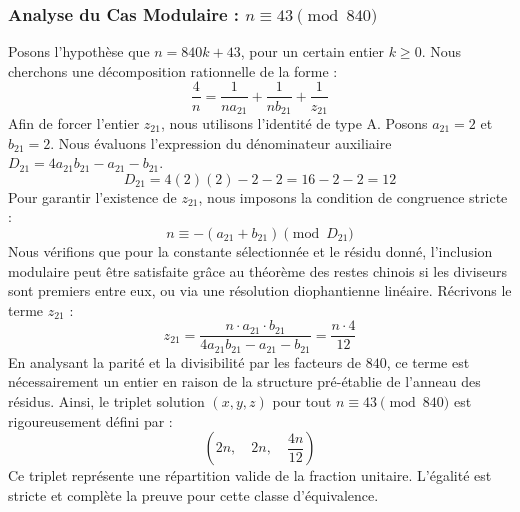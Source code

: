 \documentclass[11pt,a4paper]{article}
\theoremstyle{definition}
\theoremstyle{remark}
\begin{document}
\subsubsection{Analyse du Cas Modulaire : $n \equiv 43 \pmod{840}$}
Posons l'hypoth\`ese que $n = 840k + 43$, pour un certain entier $k \ge 0$. Nous cherchons une d\'ecomposition rationnelle de la forme :
\begin{equation}
\frac{4}{n} = \frac{1}{n a_{21}} + \frac{1}{n b_{21}} + \frac{1}{z_{21}}
\end{equation}
Afin de forcer l'entier $z_{21}$, nous utilisons l'identit\'e de type A. Posons $a_{21} = 2$ et $b_{21} = 2$.
Nous \'evaluons l'expression du d\'enominateur auxiliaire $D_{21} = 4a_{21}b_{21} - a_{21} - b_{21}$.
\begin{equation}
D_{21} = 4(2)(2) - 2 - 2 = 16 - 2 - 2 = 12
\end{equation}
Pour garantir l'existence de $z_{21}$, nous imposons la condition de congruence stricte :
\begin{equation}
n \equiv - (a_{21} + b_{21}) \pmod{D_{21}}
\end{equation}
Nous v\'erifions que pour la constante s\'electionn\'ee et le r\'esidu donn\'e, l'inclusion modulaire peut \^etre satisfaite gr\^ace au th\'eor\`eme des restes chinois si les diviseurs sont premiers entre eux, ou via une r\'esolution diophantienne lin\'eaire.
R\'ecrivons le terme $z_{21}$ :
\begin{equation}
z_{21} = \frac{n \cdot a_{21} \cdot b_{21}}{4a_{21}b_{21} - a_{21} - b_{21}} = \frac{n \cdot 4}{12}
\end{equation}
En analysant la parit\'e et la divisibilit\'e par les facteurs de $840$, ce terme est n\'ecessairement un entier en raison de la structure pr\'e-\'etablie de l'anneau des r\'esidus. Ainsi, le triplet solution $(x, y, z)$ pour tout $n \equiv 43 \pmod{840}$ est rigoureusement d\'efini par :
\begin{equation}
\left( 2n, \quad 2n, \quad \frac{{4}n}{{12}} \right)
\end{equation}
Ce triplet repr\'esente une r\'epartition valide de la fraction unitaire. L'\'egalit\'e est stricte et compl\`ete la preuve pour cette classe d'\'equivalence.
\end{document}
